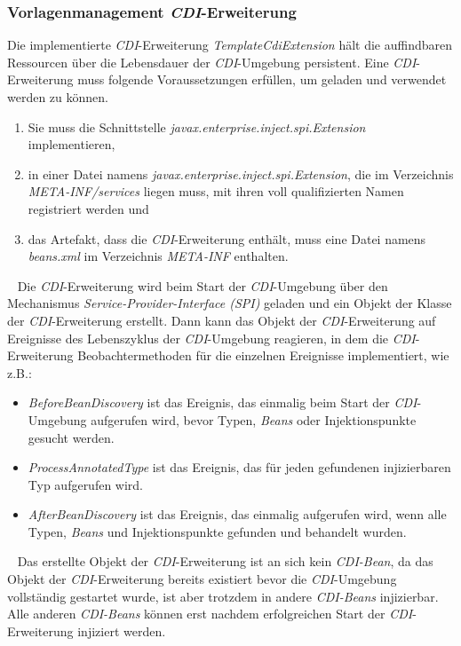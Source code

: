 \subsubsection{Vorlagenmanagement \emph{CDI}-Erweiterung}
Die implementierte \emph{CDI}-Erweiterung \emph{TemplateCdiExtension} hält die auffindbaren Ressourcen über die Lebensdauer der \emph{CDI}-Umgebung persistent. Eine \emph{CDI}-Erweiterung muss folgende Voraussetzungen erfüllen, um geladen und verwendet werden zu können. 
\begin{enumerate}
	\item Sie muss die Schnittstelle \emph{javax.enterprise.inject.spi.Extension} implementieren,
	\item in einer Datei namens \emph{javax.enterprise.inject.spi.Extension}, die im Verzeichnis \emph{META-INF/services} liegen muss, mit ihren voll qualifizierten Namen registriert werden und
	\item das Artefakt, dass die \emph{CDI}-Erweiterung enthält, muss eine Datei namens \emph{beans.xml} im Verzeichnis \emph{META-INF} enthalten.
\end{enumerate}
\ \newline
Die \emph{CDI}-Erweiterung wird beim Start der \emph{CDI}-Umgebung über den Mechanismus \emph{Service-Provider-Interface (SPI)} geladen und ein Objekt der Klasse der \emph{CDI}-Erweiterung erstellt. Dann kann das Objekt der \emph{CDI}-Erweiterung auf Ereignisse des Lebenszyklus der \emph{CDI}-Umgebung reagieren, in dem die \emph{CDI}-Erweiterung Beobachtermethoden für die einzelnen Ereignisse implementiert, wie z.B.:
\begin{itemize}
	\item\emph{BeforeBeanDiscovery}
	\newline
	ist das Ereignis, das einmalig beim Start der \emph{CDI}-Umgebung aufgerufen wird, bevor Typen, \emph{Beans} oder Injektionspunkte gesucht werden.
	\item\emph{ProcessAnnotatedType}
	\newline
	ist das Ereignis, das für jeden gefundenen injizierbaren Typ aufgerufen wird.
	\item\emph{AfterBeanDiscovery} 
	\newline
	ist das Ereignis, das einmalig aufgerufen wird, wenn alle Typen, \emph{Beans} und Injektionspunkte gefunden und behandelt wurden.
\end{itemize}
\ \newline
Das erstellte Objekt der \emph{CDI}-Erweiterung ist an sich kein \emph{CDI-Bean}, da das Objekt der \emph{CDI}-Erweiterung bereits existiert bevor die \emph{CDI}-Umgebung vollständig gestartet wurde, ist aber trotzdem in andere \emph{CDI-Beans} injizierbar. Alle anderen \emph{CDI-Beans} können erst nachdem erfolgreichen Start der \emph{CDI}-Erweiterung injiziert werden.
